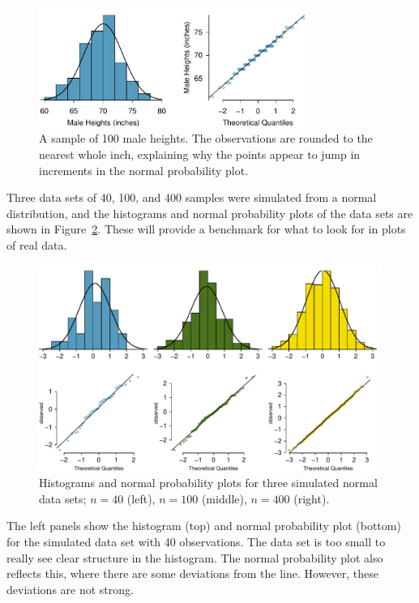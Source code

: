\begin{figure}[ht]
\centering
\includegraphics[width=0.78\textwidth]{ch_distributions/figures/fcidMHeights/fcidMHeights}
\caption{A sample of 100 male heights. The observations are rounded to the nearest whole inch, explaining why the points appear to jump in increments in the normal probability plot.}
\label{fcidMHeights}
\end{figure}


Three data sets of 40, 100, and 400 samples were simulated from a normal distribution, and the histograms and normal probability plots of the data sets are shown in Figure~\ref{normalExamples}. These will provide a benchmark for what to look for in plots of real data. \label{normalExamplesExample}

\begin{figure}
\centering
\includegraphics[width=\textwidth]{ch_distributions/figures/normalExamples/normalExamples}
\caption{Histograms and normal probability plots for three simulated normal data sets; $n=40$ (left), $n=100$ (middle), $n=400$ (right).}
\label{normalExamples}
\end{figure}

The left panels show the histogram (top) and normal probability plot (bottom) for the simulated data set with 40 observations. The data set is too small to really see clear structure in the histogram. The normal probability plot also reflects this, where there are some deviations from the line. However, these deviations are not strong.

